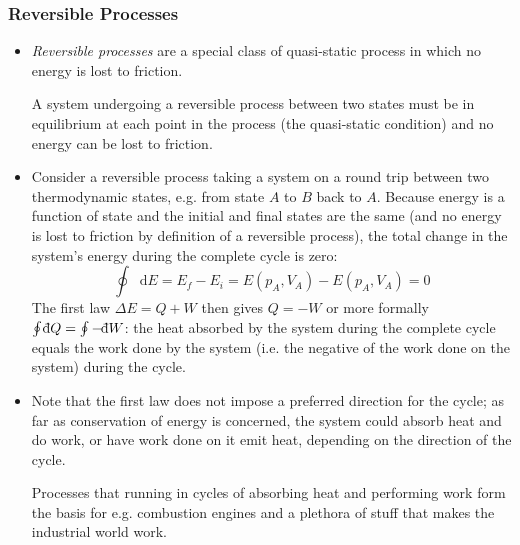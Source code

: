 \documentclass[11pt, a4paper]{article}
\newcommand{\diff}{\mathop{}\!\mathrm{d}} %
\newcommand{\dbar}{{\mathchar '26\mkern -11mu \mathrm{d}}} %
\begin{document}
\subsubsection{Reversible Processes}
\begin{itemize}
	\item \textit{Reversible processes} are a special class of quasi-static process in which no energy is lost to friction. 
	
	A system undergoing a reversible process between two states must be in equilibrium at each point in the process (the quasi-static condition) and no energy can be lost to friction.
	
	\item Consider a reversible process taking a system on a round trip between two thermodynamic states, e.g. from state $ A $ to $ B $ back to $ A $. Because energy is a function of state and the initial and final states are the same (and no energy is lost to friction by definition of a reversible process), the total change in the system's energy during the complete cycle is zero: 
	\begin{equation*}
		\oint \diff E = E_{f} - E_{i} = E(p_{A}, V_{A}) - E(p_{A}, V_{A}) = 0
	\end{equation*}
	The first law $ \Delta E = Q + W $ then gives $ Q = - W $ or more formally $ \oint \dbar Q = \oint - \dbar W $: the heat absorbed by the system during the complete cycle equals the work done by the system  (i.e. the negative of the work done on the system) during the cycle.
	
	\item Note that the first law does not impose a preferred direction for the cycle; as far as conservation of energy is concerned, the system could absorb heat and do work, or have work done on it emit heat, depending on the direction of the cycle. 
	
	Processes that running in cycles of absorbing heat and performing work form the basis for e.g. combustion engines and a plethora of stuff that makes the industrial world work.
\end{itemize}
\end{document}

